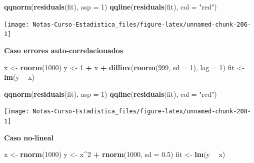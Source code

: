 \documentclass[
  12pt,
]{book}
\newenvironment{Shaded}{\begin{snugshade}}{\end{snugshade}}
\newcommand{\DataTypeTok}[1]{\textcolor[rgb]{0.13,0.29,0.53}{#1}}
\newcommand{\DecValTok}[1]{\textcolor[rgb]{0.00,0.00,0.81}{#1}}
\newcommand{\FloatTok}[1]{\textcolor[rgb]{0.00,0.00,0.81}{#1}}
\newcommand{\KeywordTok}[1]{\textcolor[rgb]{0.13,0.29,0.53}{\textbf{#1}}}
\newcommand{\NormalTok}[1]{#1}
\newcommand{\OperatorTok}[1]{\textcolor[rgb]{0.81,0.36,0.00}{\textbf{#1}}}
\newcommand{\StringTok}[1]{\textcolor[rgb]{0.31,0.60,0.02}{#1}}
\theoremstyle{definition}
\theoremstyle{definition}
\theoremstyle{definition}
\theoremstyle{remark}
\begin{document}
\begin{Shaded}
\begin{Highlighting}[]
\KeywordTok{qqnorm}\NormalTok{(}\KeywordTok{residuals}\NormalTok{(fit), }\DataTypeTok{asp =} \DecValTok{1}\NormalTok{)}
\KeywordTok{qqline}\NormalTok{(}\KeywordTok{residuals}\NormalTok{(fit), }\DataTypeTok{col =} \StringTok{"red"}\NormalTok{)}
\end{Highlighting}
\end{Shaded}

\begin{center}\texttt{[image: Notas-Curso-Estadistica\_files/figure-latex/unnamed-chunk-206-1]} \end{center}

\textbf{Caso errores auto-correlacionados}

\begin{Shaded}
\begin{Highlighting}[]
\NormalTok{x <-}\StringTok{ }\KeywordTok{rnorm}\NormalTok{(}\DecValTok{1000}\NormalTok{)}
\NormalTok{y <-}\StringTok{ }\DecValTok{1} \OperatorTok{+}\StringTok{ }\NormalTok{x }\OperatorTok{+}\StringTok{ }\KeywordTok{diffinv}\NormalTok{(}\KeywordTok{rnorm}\NormalTok{(}\DecValTok{999}\NormalTok{, }\DataTypeTok{sd =} \DecValTok{1}\NormalTok{), }\DataTypeTok{lag =} \DecValTok{1}\NormalTok{)}
\NormalTok{fit <-}\StringTok{ }\KeywordTok{lm}\NormalTok{(y }\OperatorTok{~}\StringTok{ }\NormalTok{x)}
\end{Highlighting}
\end{Shaded}

\begin{Shaded}
\begin{Highlighting}[]
\KeywordTok{qqnorm}\NormalTok{(}\KeywordTok{residuals}\NormalTok{(fit), }\DataTypeTok{asp =} \DecValTok{1}\NormalTok{)}
\KeywordTok{qqline}\NormalTok{(}\KeywordTok{residuals}\NormalTok{(fit), }\DataTypeTok{col =} \StringTok{"red"}\NormalTok{)}
\end{Highlighting}
\end{Shaded}

\begin{center}\texttt{[image: Notas-Curso-Estadistica\_files/figure-latex/unnamed-chunk-208-1]} \end{center}

\textbf{Caso no-lineal}

\begin{Shaded}
\begin{Highlighting}[]
\NormalTok{x <-}\StringTok{ }\KeywordTok{rnorm}\NormalTok{(}\DecValTok{1000}\NormalTok{)}
\NormalTok{y <-}\StringTok{ }\NormalTok{x}\OperatorTok{^}\DecValTok{2} \OperatorTok{+}\StringTok{ }\KeywordTok{rnorm}\NormalTok{(}\DecValTok{1000}\NormalTok{, }\DataTypeTok{sd =} \FloatTok{0.5}\NormalTok{)}
\NormalTok{fit <-}\StringTok{ }\KeywordTok{lm}\NormalTok{(y }\OperatorTok{~}\StringTok{ }\NormalTok{x)}
\end{Highlighting}
\end{Shaded}
\end{document}
